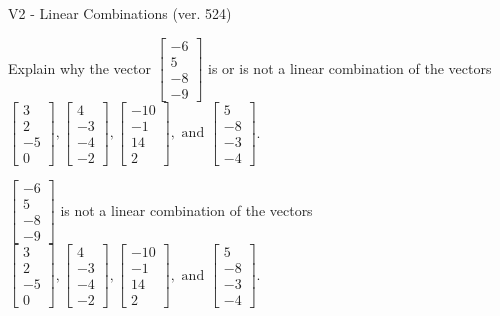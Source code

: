 \begin{exercise}
  \begin{exerciseTitle}V2 - Linear Combinations (ver. 524)\end{exerciseTitle}
  \begin{exerciseStatement}
    Explain why the vector \(\left[\begin{array}{c}
-6 \\
5 \\
-8 \\
-9
\end{array}\right]\)  is or is not a linear 
	combination of the vectors \(\left[\begin{array}{c}
3 \\
2 \\
-5 \\
0
\end{array}\right] , \left[\begin{array}{c}
4 \\
-3 \\
-4 \\
-2
\end{array}\right] , \left[\begin{array}{c}
-10 \\
-1 \\
14 \\
2
\end{array}\right] , \text{ and } \left[\begin{array}{c}
5 \\
-8 \\
-3 \\
-4
\end{array}\right]\).
	


  \end{exerciseStatement}
  \begin{exerciseAnswer}
   \(\left[\begin{array}{c}
-6 \\
5 \\
-8 \\
-9
\end{array}\right]\) 
  	 is not  
	a linear combination of the vectors \(\left[\begin{array}{c}
3 \\
2 \\
-5 \\
0
\end{array}\right] , \left[\begin{array}{c}
4 \\
-3 \\
-4 \\
-2
\end{array}\right] , \left[\begin{array}{c}
-10 \\
-1 \\
14 \\
2
\end{array}\right] , \text{ and } \left[\begin{array}{c}
5 \\
-8 \\
-3 \\
-4
\end{array}\right]\).


\end{exerciseAnswer}
\end{exercise}
